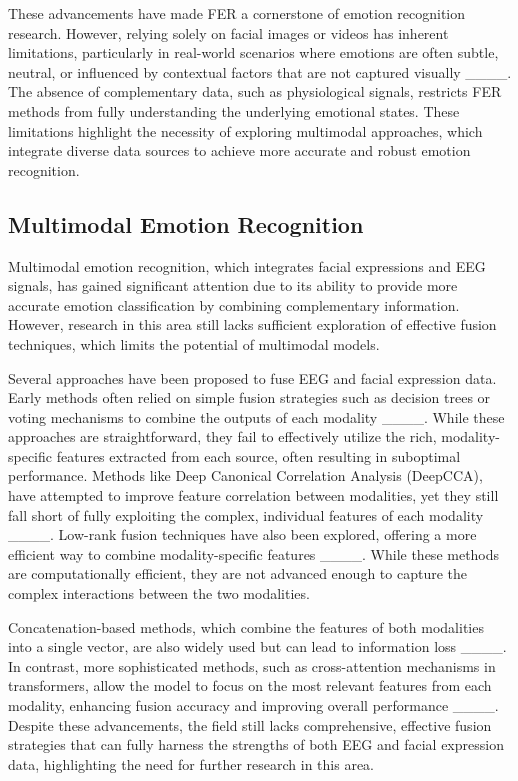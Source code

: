 These advancements have made FER a cornerstone of emotion recognition research. However, relying solely on facial images or videos has inherent limitations, particularly in real-world scenarios where emotions are often subtle, neutral, or influenced by contextual factors that are not captured visually ____. The absence of complementary data, such as physiological signals, restricts FER methods from fully understanding the underlying emotional states. These limitations highlight the necessity of exploring multimodal approaches, which integrate diverse data sources to achieve more accurate and robust emotion recognition.

\subsection{Multimodal Emotion Recognition}
Multimodal emotion recognition, which integrates facial expressions and EEG signals, has gained significant attention due to its ability to provide more accurate emotion classification by combining complementary information. However, research in this area still lacks sufficient exploration of effective fusion techniques, which limits the potential of multimodal models.

Several approaches have been proposed to fuse EEG and facial expression data. Early methods often relied on simple fusion strategies such as decision trees or voting mechanisms to combine the outputs of each modality ____. While these approaches are straightforward, they fail to effectively utilize the rich, modality-specific features extracted from each source, often resulting in suboptimal performance. Methods like Deep Canonical Correlation Analysis (DeepCCA), have attempted to improve feature correlation between modalities, yet they still fall short of fully exploiting the complex, individual features of each modality ____. Low-rank fusion techniques have also been explored, offering a more efficient way to combine modality-specific features ____. While these methods are computationally efficient, they are not advanced enough to capture the complex interactions between the two modalities.

Concatenation-based methods, which combine the features of both modalities into a single vector, are also widely used but can lead to information loss ____. In contrast, more sophisticated methods, such as cross-attention mechanisms in transformers, allow the model to focus on the most relevant features from each modality, enhancing fusion accuracy and improving overall performance ____. Despite these advancements, the field still lacks comprehensive, effective fusion strategies that can fully harness the strengths of both EEG and facial expression data, highlighting the need for further research in this area.

